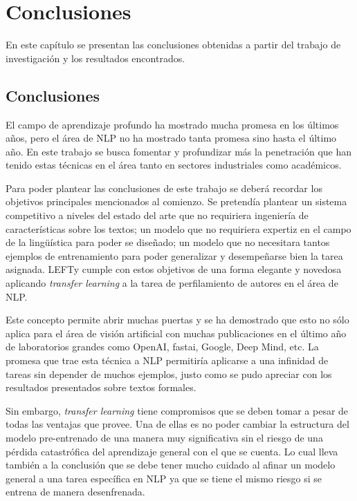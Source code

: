 
\chapter{Conclusiones}

\label{Chapter6} %

En este capítulo se presentan las conclusiones obtenidas a partir del trabajo de investigación y los resultados encontrados.

\section{Conclusiones}

El campo de aprendizaje profundo ha mostrado mucha promesa en los últimos años, pero el área de NLP no ha mostrado tanta promesa sino hasta el último año. En este trabajo se busca fomentar y profundizar más la penetración que han tenido estas técnicas en el área tanto en sectores industriales como académicos.

Para poder plantear las conclusiones de este trabajo se deberá recordar los objetivos principales mencionados al comienzo. Se pretendía plantear un sistema competitivo a niveles del estado del arte que no requiriera ingeniería de características sobre los textos; un modelo que no requiriera expertiz en el campo de la lingüística para poder se diseñado; un modelo que no necesitara tantos ejemplos de entrenamiento para poder generalizar y desempeñarse bien la tarea asignada. LEFTy cumple con estos objetivos de una forma elegante y novedosa aplicando \textit{transfer learning} a la tarea de perfilamiento de autores en el área de NLP.

Este concepto permite abrir muchas puertas y se ha demostrado que esto no sólo aplica para el área de visión artificial con muchas publicaciones en el último año de laboratorios grandes como OpenAI, fastai, Google, Deep Mind, etc. La promesa que trae esta técnica a NLP permitiría aplicarse a una infinidad de tareas sin depender de muchos ejemplos, justo como se pudo apreciar con los resultados presentados sobre textos formales.

Sin embargo, \textit{transfer learning} tiene compromisos que se deben tomar a pesar de todas las ventajas que provee. Una de ellas es no poder cambiar la estructura del modelo pre-entrenado de una manera muy significativa sin el riesgo de una pérdida catastrófica del aprendizaje general con el que se cuenta. Lo cual lleva también a la conclusión que se debe tener mucho cuidado al afinar un modelo general a una tarea específica en NLP ya que se tiene el mismo riesgo si se entrena de manera desenfrenada.

